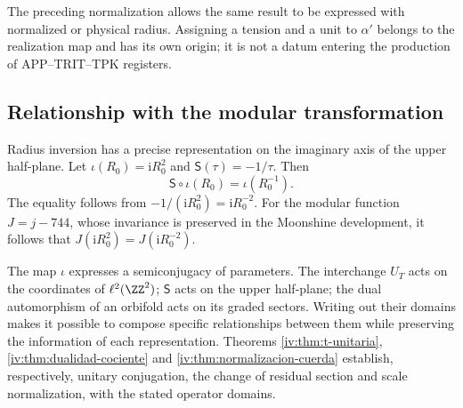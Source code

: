The preceding normalization allows the same result to be expressed with
normalized or physical radius. Assigning a tension and a
unit to \(\alpha'\) belongs to the realization map and has
its own origin; it is not a datum entering the production
of APP--TRIT--TPK registers.

\subsection{Relationship with the modular transformation}

Radius inversion has a precise representation on the
imaginary axis of the upper half-plane. Let
\(\iota(R_0)=\mathrm iR_0^2\) and
\(\mathsf S(\tau)=-1/\tau\). Then
\begin{equation}
 \mathsf S\circ\iota(R_0)=\iota(R_0^{-1}).
 \label{iv:eq:semiconjugacion-modular}
\end{equation}
The equality follows from
\(-1/(\mathrm iR_0^2)=\mathrm iR_0^{-2}\). For the modular
function \(J=j-744\), whose invariance is preserved in the
Moonshine development, it follows that
\(J(\mathrm iR_0^2)=J(\mathrm iR_0^{-2})\).

The map \(\iota\) expresses a semiconjugacy of parameters.
The interchange \(U_T\) acts on the coordinates of
\(\ell^2(\ZZ^2)\); \(\mathsf S\) acts on the upper
half-plane; the dual automorphism of an orbifold acts on its
graded sectors. Writing out their domains makes it possible to
compose specific relationships between them while preserving the
information of each representation. Theorems
\ref{iv:thm:t-unitaria}, \ref{iv:thm:dualidad-cociente}
and \ref{iv:thm:normalizacion-cuerda} establish, respectively,
unitary conjugation, the change of residual section and scale
normalization, with the stated operator domains.

